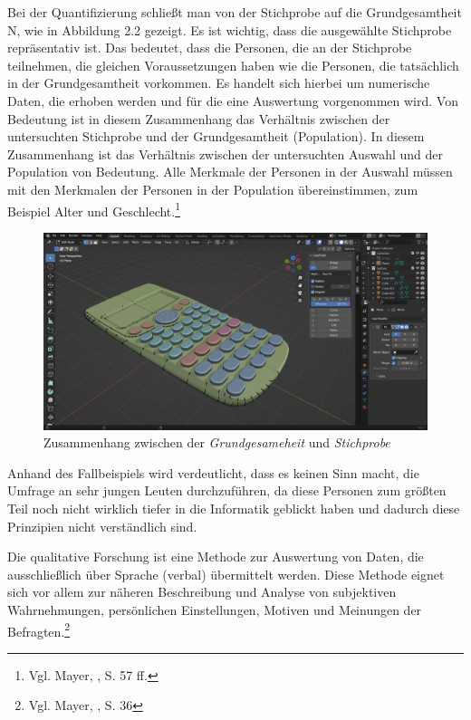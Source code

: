 Bei der Quantifizierung schließt man von der Stichprobe auf die Grundgesamtheit N, wie in Abbildung 2.2 gezeigt. Es ist
wichtig, dass die ausgewählte Stichprobe repräsentativ ist. Das bedeutet, dass die Personen, die an der Stichprobe
teilnehmen, die gleichen Voraussetzungen haben wie die Personen, die tatsächlich in der Grundgesamtheit vorkommen. Es
handelt sich hierbei um numerische Daten, die erhoben werden und für die eine Auswertung vorgenommen wird. Von Bedeutung
ist in diesem Zusammenhang das Verhältnis zwischen der untersuchten Stichprobe und der Grundgesamtheit (Population). In
diesem Zusammenhang ist das Verhältnis zwischen der untersuchten Auswahl und der Population von Bedeutung. Alle Merkmale
der Personen in der Auswahl müssen mit den Merkmalen der Personen in der Population übereinstimmen, zum Beispiel Alter
und Geschlecht.\footnote{Vgl. Mayer, \cite{Interview und schriftliche Befragung}, S. 57 ff.}

\begin{figure}[h]
    \centering
    \includegraphics[width=1\textwidth]{images/calculatoreditmode.png}
    \caption{Zusammenhang zwischen der \textit{Grundgesameheit} und \textit{Stichprobe}}
    \label{fig:calculatoreditmode}
\end{figure}

Anhand des Fallbeispiels wird verdeutlicht, dass es keinen Sinn macht, die Umfrage an sehr jungen Leuten durchzuführen,
da diese Personen zum größten Teil noch nicht wirklich tiefer in die Informatik geblickt haben und dadurch diese Prinzipien
nicht verständlich sind.

Die qualitative Forschung ist eine Methode zur Auswertung von Daten, die ausschließlich über Sprache (verbal) übermittelt
werden. Diese Methode eignet sich vor allem zur näheren Beschreibung und Analyse von subjektiven Wahrnehmungen,
persönlichen Einstellungen, Motiven und Meinungen der Befragten.\footnote{Vgl. Mayer, \cite{Interview und schriftliche Befragung}, S. 36}

